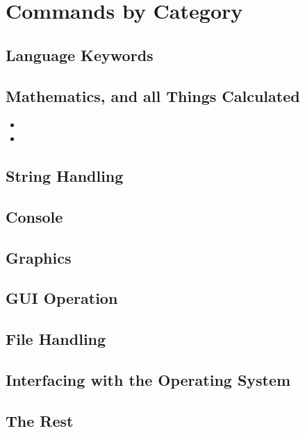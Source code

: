 
\section{Commands by Category}

\subsection{Language Keywords}

\subsection{Mathematics, and all Things Calculated}

\begin{itemize}
\item {}
\item {}
\end{itemize}

\subsection{String Handling}

\subsection{Console}


\subsection{Graphics}


\subsection{GUI Operation}


\subsection{File Handling}

\subsection{Interfacing with the Operating System}

\subsection{The Rest}


